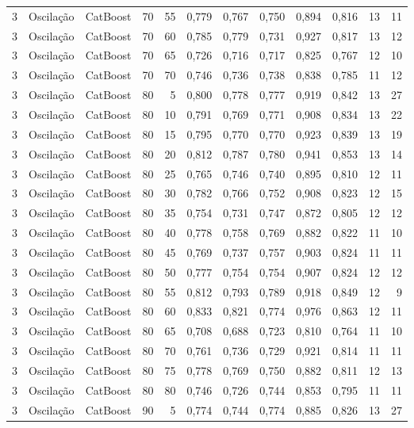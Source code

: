\begin{longtable}{ccclrrrrrrrr}
3 & Oscilação & CatBoost & 70 & 55 & 0,779 & 0,767 & 0,750 & 0,894 & 0,816 & 13 & 11 \\
3 & Oscilação & CatBoost & 70 & 60 & 0,785 & 0,779 & 0,731 & 0,927 & 0,817 & 13 & 12 \\
3 & Oscilação & CatBoost & 70 & 65 & 0,726 & 0,716 & 0,717 & 0,825 & 0,767 & 12 & 10 \\
3 & Oscilação & CatBoost & 70 & 70 & 0,746 & 0,736 & 0,738 & 0,838 & 0,785 & 11 & 12 \\
3 & Oscilação & CatBoost & 80 & 5 & 0,800 & 0,778 & 0,777 & 0,919 & 0,842 & 13 & 27 \\
3 & Oscilação & CatBoost & 80 & 10 & 0,791 & 0,769 & 0,771 & 0,908 & 0,834 & 13 & 22 \\
3 & Oscilação & CatBoost & 80 & 15 & 0,795 & 0,770 & 0,770 & 0,923 & 0,839 & 13 & 19 \\
3 & Oscilação & CatBoost & 80 & 20 & 0,812 & 0,787 & 0,780 & 0,941 & 0,853 & 13 & 14 \\
3 & Oscilação & CatBoost & 80 & 25 & 0,765 & 0,746 & 0,740 & 0,895 & 0,810 & 12 & 11 \\
3 & Oscilação & CatBoost & 80 & 30 & 0,782 & 0,766 & 0,752 & 0,908 & 0,823 & 12 & 15 \\
3 & Oscilação & CatBoost & 80 & 35 & 0,754 & 0,731 & 0,747 & 0,872 & 0,805 & 12 & 12 \\
3 & Oscilação & CatBoost & 80 & 40 & 0,778 & 0,758 & 0,769 & 0,882 & 0,822 & 11 & 10 \\
3 & Oscilação & CatBoost & 80 & 45 & 0,769 & 0,737 & 0,757 & 0,903 & 0,824 & 11 & 11 \\
3 & Oscilação & CatBoost & 80 & 50 & 0,777 & 0,754 & 0,754 & 0,907 & 0,824 & 12 & 12 \\
3 & Oscilação & CatBoost & 80 & 55 & 0,812 & 0,793 & 0,789 & 0,918 & 0,849 & 12 & 9 \\
3 & Oscilação & CatBoost & 80 & 60 & 0,833 & 0,821 & 0,774 & 0,976 & 0,863 & 12 & 11 \\
3 & Oscilação & CatBoost & 80 & 65 & 0,708 & 0,688 & 0,723 & 0,810 & 0,764 & 11 & 10 \\
3 & Oscilação & CatBoost & 80 & 70 & 0,761 & 0,736 & 0,729 & 0,921 & 0,814 & 11 & 11 \\
3 & Oscilação & CatBoost & 80 & 75 & 0,778 & 0,769 & 0,750 & 0,882 & 0,811 & 12 & 13 \\
3 & Oscilação & CatBoost & 80 & 80 & 0,746 & 0,726 & 0,744 & 0,853 & 0,795 & 11 & 11 \\
3 & Oscilação & CatBoost & 90 & 5 & 0,774 & 0,744 & 0,774 & 0,885 & 0,826 & 13 & 27 \\

\end{longtable}
